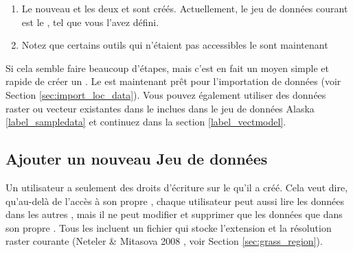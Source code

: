 \begin{enumerate}
  \item Le nouveau  et les deux  et  sont créés. Actuellement, le jeu de données courant est le , tel que vous l'avez défini.
  \item Notez que certains outils qui n'étaient pas accessibles le sont maintenant
\end{enumerate}

Si cela semble faire beaucoup d'étapes, mais c'est en fait un moyen simple et rapide de créer un . Le  est maintenant prêt pour l'importation de données (voir Section \ref{sec:import_loc_data}). Vous pouvez également utiliser des données raster ou vecteur existantes dans le  inclues dans le jeu de données \qg Alaska \ref{label_sampledata} et continuez dans la section \ref{label_vectmodel}.

\subsection{Ajouter un nouveau Jeu de données}\label{sec:add_mapset}

Un utilisateur a seulement des droits d'écriture sur le  \grass qu'il a créé. Cela veut dire, qu'au-delà de l'accès à son propre  \grass, chaque utilisateur peut aussi lire les données dans les autres , mais il ne peut modifier et supprimer que les données que dans son propre . Tous les  incluent un fichier  qui stocke l'extension et la résolution raster courante (Neteler \& Mitasova 2008 \cite{neteler_mitasova08}, voir Section \ref{sec:grass_region}).


